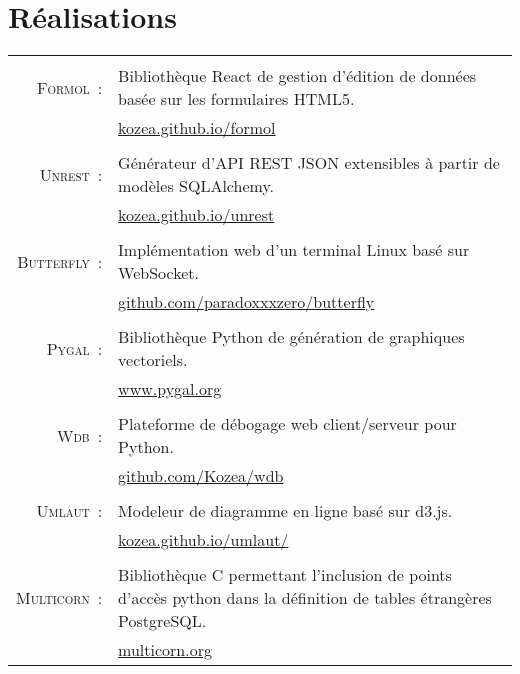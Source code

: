 \documentclass[a4paper,10pt]{article}
\begin{document}
  \section{Réalisations}
  \begin{tabular}{r|p{11cm}}
    \multicolumn{2}{c}{} \\
    \textsc{Formol :}
      & Bibliothèque React de gestion d’édition de données basée sur les formulaires HTML5. \\
      & \href{https://kozea.github.io/formol/}{kozea.github.io/formol} \\

    \multicolumn{2}{c}{} \\
    \textsc{Unrest :}
      & Générateur d'API REST JSON extensibles à partir de modèles SQLAlchemy. \\
      & \href{https://kozea.github.io/unrest/}{kozea.github.io/unrest} \\

    \multicolumn{2}{c}{} \\
    \textsc{Butterfly :}
      & Implémentation web d'un terminal Linux basé sur WebSocket. \\
      & \href{https://github.com/paradoxxxzero/butterfly}{github.com/paradoxxxzero/butterfly} \\

    \multicolumn{2}{c}{} \\
    \textsc{Pygal :}
      & Bibliothèque Python de génération de graphiques vectoriels. \\
      & \href{http://www.pygal.org/}{www.pygal.org} \\

    \multicolumn{2}{c}{} \\
    \textsc{Wdb :}
      & Plateforme de débogage web client/serveur pour Python. \\
      & \href{https://github.com/Kozea/wdb}{github.com/Kozea/wdb} \\

    \multicolumn{2}{c}{} \\
    \textsc{Umlaut :}
      & Modeleur de diagramme en ligne basé sur d3.js. \\
      & \href{http://kozea.github.io/umlaut/}{kozea.github.io/umlaut/} \\

    \multicolumn{2}{c}{} \\
    \textsc{Multicorn :}
      & Bibliothèque C permettant l’inclusion de points d'accès python dans la définition de tables étrangères PostgreSQL. \\
      & \href{https://multicorn.org/}{multicorn.org} \\


\end{tabular}
\end{document}
